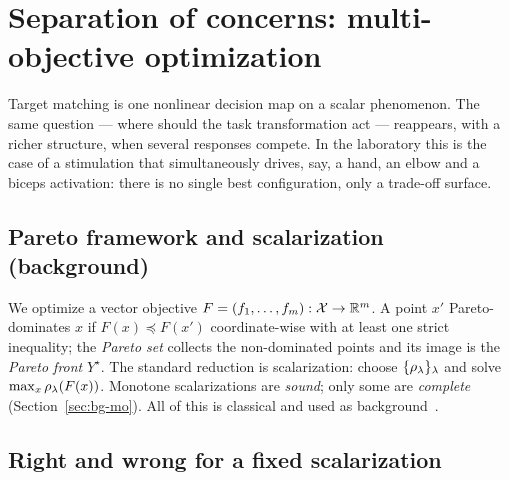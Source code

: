 \FloatBarrier
\section{Separation of concerns: multi-objective optimization}
\label{sec:contrib-mo}

Target matching is one nonlinear decision map on a scalar phenomenon. The same
question --- where should the task transformation act --- reappears, with a richer
structure, when several responses compete. In the laboratory this is the case of
a stimulation that simultaneously drives, say, a hand, an elbow and a biceps
activation: there is no single best configuration, only a trade-off surface.

\subsection{Pareto framework and scalarization (background)}
\label{sec:contrib-mo-pareto}

We optimize a vector objective $F=(f_1,\dots,f_m):\mathcal{X}\to\mathbb{R}^m$. A point $x'$
Pareto-dominates $x$ if $F(x)\preceq F(x')$ coordinate-wise with at least one
strict inequality; the \emph{Pareto set} collects the non-dominated points and
its image is the \emph{Pareto front} $Y^\star$. The standard reduction is
scalarization: choose $\{\rho_\lambda\}_{\lambda}$ and solve
$\max_x\rho_\lambda(F(x))$. Monotone scalarizations are \emph{sound}; only some
are \emph{complete} (Section~\ref{sec:bg-mo}). All of this is classical and used
as background~\cite{zitzler1999,paria2019}. \hfill\Plit

\subsection{Right and wrong for a fixed scalarization}
\label{sec:contrib-mo-rightwrong}


